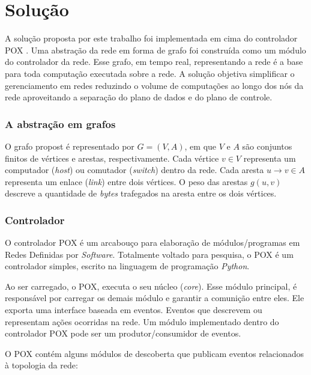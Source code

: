 \chapter{Solução}

A solução proposta por este trabalho foi implementada em cima do controlador
POX \citep{pox}. 
Uma abstração da rede em forma de grafo foi construída como um módulo 
do controlador da rede.
Esse grafo, em tempo real, representando a rede é a base para toda computação
executada sobre a rede.
A solução objetiva simplificar o gerenciamento em redes reduzindo o volume 
de computações ao longo dos nós da rede aproveitando a separação do plano 
de dados e do plano de controle.

\subsection{A abstração em grafos}

O grafo propost é representado por $G=(V, A)$, em que $V$ e $A$ são conjuntos
finitos de vértices e arestas, respectivamente.
Cada vértice $v \in V$ representa um computador (\emph{host}) ou comutador
(\emph{switch}) dentro da rede.
Cada aresta $u \to v \in A$ representa um enlace (\emph{link}) entre dois
vértices.
O peso das arestas $g(u, v)$ descreve a quantidade de \emph{bytes} trafegados
na aresta entre os dois vértices.

\subsection{Controlador}
\label{sec:controller}

O controlador POX é um arcabouço para elaboração de módulos/programas 
em Redes Definidas por \emph{Software}.
Totalmente voltado para pesquisa, o POX é um controlador simples, 
escrito na linguagem de programação \emph{Python}.

Ao ser carregado, o POX, executa o seu núcleo (\emph{core}). 
Esse módulo principal, é responsável por carregar os demais 
módulo e garantir a comunição entre eles.
Ele exporta uma interface baseada em eventos. 
Eventos que descrevem ou representam ações ocorridas na rede.
Um módulo implementado dentro do controlador POX pode ser um 
produtor/consumidor de eventos.

O POX contém alguns módulos de descoberta que publicam eventos relacionados
à topologia da rede:

